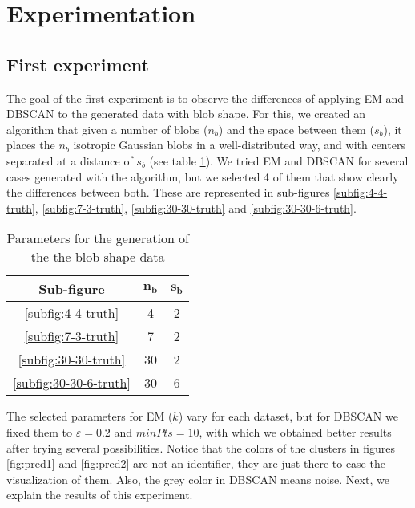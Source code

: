 \section{Experimentation}
\label{sec:experimentation}
\subsection{First experiment}
The goal of the first experiment is to observe the differences of applying EM and DBSCAN to the generated data with blob shape. For this, we created an algorithm that given a number of blobs ($n_b$) and the space between them ($s_b$), it places the $n_b$ isotropic Gaussian blobs in a well-distributed way, and with centers separated at a distance of $s_b$ (see table \ref{tab:data-param}). We tried EM and DBSCAN for several cases generated with the algorithm, but we selected 4 of them that show clearly the differences between both. These are represented in sub-figures \ref{subfig:4-4-truth}, \ref{subfig:7-3-truth}, \ref{subfig:30-30-truth} and \ref{subfig:30-30-6-truth}.
\begin{table}[hbtp]
    \centering
    \begin{tabular}{c c c}
        \toprule
        \textbf{Sub-figure} & $\bm{n_b}$ & $\bm{s_b}$ \\ \midrule
        \ref{subfig:4-4-truth} & 4 & 2 \\
        \ref{subfig:7-3-truth} & 7 & 2 \\
        \ref{subfig:30-30-truth} & 30 & 2 \\
        \ref{subfig:30-30-6-truth} & 30 & 6 \\
        \bottomrule
    \end{tabular}
    \caption{Parameters for the generation of the the blob shape data}
    \label{tab:data-param}
\end{table}

The selected parameters for EM ($k$) vary for each dataset, but for DBSCAN we fixed them to $\varepsilon = 0.2$ and $minPts = 10$, with which we obtained better results after trying several possibilities. Notice that the colors of the clusters in figures \ref{fig:pred1} and \ref{fig:pred2} are not an identifier, they are just there to ease the visualization of them. Also, the grey color in DBSCAN means noise. Next, we explain the results of this experiment.

